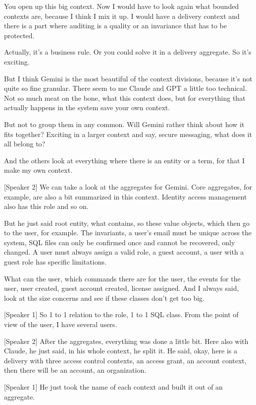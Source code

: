 You open up this big context. Now I would have to look again what bounded contexts are, because I think I mix it up. I would have a delivery context and there is a part where auditing is a quality or an invariance that has to be protected.

Actually, it's a business rule. Or you could solve it in a delivery aggregate. So it's exciting.

But I think Gemini is the most beautiful of the context divisions, because it's not quite so fine granular. There seem to me Claude and GPT a little too technical. Not so much meat on the bone, what this context does, but for everything that actually happens in the system save your own context.

But not to group them in any common. Will Gemini rather think about how it fits together? Exciting in a larger context and say, secure messaging, what does it all belong to?

And the others look at everything where there is an entity or a term, for that I make my own context.

[Speaker 2]
We can take a look at the aggregates for Gemini. Core aggregates, for example, are also a bit summarized in this context. Identity access management also has this role and so on.

But he just said root entity, what contains, so these value objects, which then go to the user, for example. The invariants, a user's email must be unique across the system, SQL files can only be confirmed once and cannot be recovered, only changed. A user must always assign a valid role, a guest account, a user with a guest role has specific limitations.

What can the user, which commands there are for the user, the events for the user, user created, guest account created, license assigned. And I always said, look at the size concerns and see if these classes don't get too big.

[Speaker 1]
So 1 to 1 relation to the role, 1 to 1 SQL class. From the point of view of the user, I have several users.

[Speaker 2]
After the aggregates, everything was done a little bit. Here also with Claude, he just said, in his whole context, he split it. He said, okay, here is a delivery with three access control contexts, an access grant, an account context, then there will be an account, an organization.

[Speaker 1]
He just took the name of each context and built it out of an aggregate.

